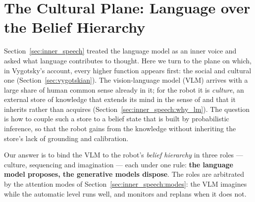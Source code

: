 %

\section{The Cultural Plane: Language over the Belief Hierarchy}
\label{sec:lang_hierarchy}

Section~\ref{sec:inner_speech} treated the language model as an inner voice and asked what language contributes to
thought. Here we turn to the plane on which, in Vygotsky's account, every higher function appears first: the social
and cultural one (Section~\ref{sec:vygotskian}). The vision-language model (VLM) arrives with a large share
of human common sense already in it; for the robot it is \emph{culture}, an external store of knowledge that extends
its mind in the sense of \cite{clark1998extended} and that it inherits rather than acquires
(Section~\ref{sec:inner_speech:why_lm}). The question is how to couple such a store to a belief state that is built
by probabilistic inference, so that the robot gains from the knowledge without inheriting the store's lack of
grounding and calibration.

Our answer is to bind the VLM to the robot's \emph{belief hierarchy} in three roles --- culture, sequencing and
imagination --- each under one rule: \textbf{the language model proposes, the generative models dispose}. The roles
are arbitrated by the attention modes of Section~\ref{sec:inner_speech:modes}: the VLM imagines while the automatic
level runs well, and monitors and replans when it does not.

